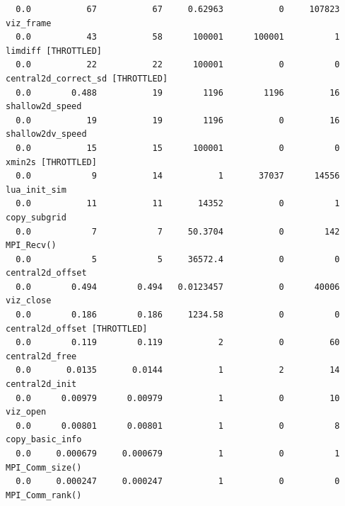 \documentclass{article}
\begin{document}
{\begin{verbatim}
  0.0           67           67     0.62963           0     107823 viz_frame 
  0.0           43           58      100001      100001          1 limdiff [THROTTLED]
  0.0           22           22      100001           0          0 central2d_correct_sd [THROTTLED]
  0.0        0.488           19        1196        1196         16 shallow2d_speed 
  0.0           19           19        1196           0         16 shallow2dv_speed 
  0.0           15           15      100001           0          0 xmin2s [THROTTLED]
  0.0            9           14           1       37037      14556 lua_init_sim 
  0.0           11           11       14352           0          1 copy_subgrid 
  0.0            7            7     50.3704           0        142 MPI_Recv() 
  0.0            5            5     36572.4           0          0 central2d_offset 
  0.0        0.494        0.494   0.0123457           0      40006 viz_close 
  0.0        0.186        0.186     1234.58           0          0 central2d_offset [THROTTLED]
  0.0        0.119        0.119           2           0         60 central2d_free 
  0.0       0.0135       0.0144           1           2         14 central2d_init 
  0.0      0.00979      0.00979           1           0         10 viz_open 
  0.0      0.00801      0.00801           1           0          8 copy_basic_info 
  0.0     0.000679     0.000679           1           0          1 MPI_Comm_size() 
  0.0     0.000247     0.000247           1           0          0 MPI_Comm_rank() 
\end{verbatim}
}
\end{document}

